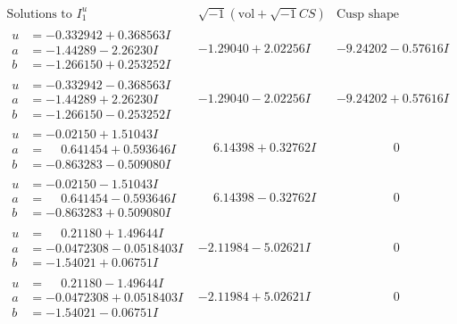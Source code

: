 \documentclass[1p]{elsarticle_modified}
\theoremstyle{definition}
\newcommand{\I}{\sqrt{-1}}
\begin{document}
$$\begin{array}{c|c|c}
 \end{array}$$\newpage$$\begin{array}{c|c|c}  
\text{Solutions to }I^u_{1}& \I (\text{vol} + \sqrt{-1}CS) & \text{Cusp shape}\\
 \hline 
\begin{aligned}
u &= -0.332942 + 0.368563 I \\
a &= -1.44289 - 2.26230 I \\
b &= -1.266150 + 0.253252 I\end{aligned}
 & -1.29040 + 2.02256 I & -9.24202 - 0.57616 I \\ \hline\begin{aligned}
u &= -0.332942 - 0.368563 I \\
a &= -1.44289 + 2.26230 I \\
b &= -1.266150 - 0.253252 I\end{aligned}
 & -1.29040 - 2.02256 I & -9.24202 + 0.57616 I \\ \hline\begin{aligned}
u &= -0.02150 + 1.51043 I \\
a &= \phantom{-}0.641454 + 0.593646 I \\
b &= -0.863283 - 0.509080 I\end{aligned}
 & \phantom{-}6.14398 + 0.32762 I & \phantom{-0.000000 } 0 \\ \hline\begin{aligned}
u &= -0.02150 - 1.51043 I \\
a &= \phantom{-}0.641454 - 0.593646 I \\
b &= -0.863283 + 0.509080 I\end{aligned}
 & \phantom{-}6.14398 - 0.32762 I & \phantom{-0.000000 } 0 \\ \hline\begin{aligned}
u &= \phantom{-}0.21180 + 1.49644 I \\
a &= -0.0472308 - 0.0518403 I \\
b &= -1.54021 + 0.06751 I\end{aligned}
 & -2.11984 - 5.02621 I & \phantom{-0.000000 } 0 \\ \hline\begin{aligned}
u &= \phantom{-}0.21180 - 1.49644 I \\
a &= -0.0472308 + 0.0518403 I \\
b &= -1.54021 - 0.06751 I\end{aligned}
 & -2.11984 + 5.02621 I & \phantom{-0.000000 } 0 \\ \hline\begin{aligned}

\end{aligned}
\end{array}$$
\end{document}

